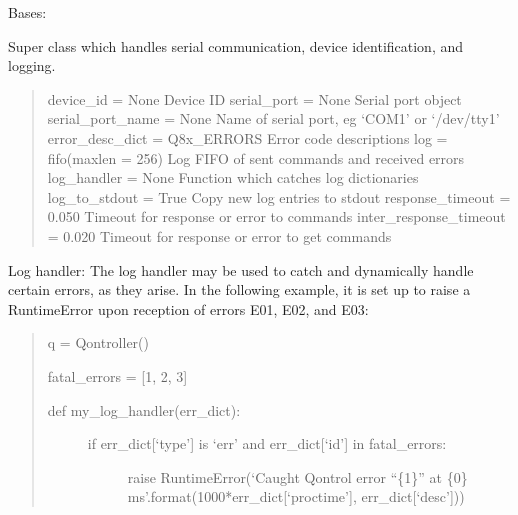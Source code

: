 \documentclass[letterpaper,10pt,english]{sphinxmanual}
\begin{document}

\begin{fulllineitems}
\label{\detokenize{qontrol:qontrol.Qontroller}}
Bases: 

Super class which handles serial communication, device identification, and logging.
\begin{quote}

device\_id = None                                        Device ID
serial\_port = None                                      Serial port object
serial\_port\_name = None                         Name of serial port, eg ‘COM1’ or ‘/dev/tty1’
error\_desc\_dict = Q8x\_ERRORS                    Error code descriptions
log = fifo(maxlen = 256)                        Log FIFO of sent commands and received errors
log\_handler = None                                      Function which catches log dictionaries
log\_to\_stdout = True                            Copy new log entries to stdout
response\_timeout = 0.050                        Timeout for response or error to commands
inter\_response\_timeout = 0.020          Timeout for response or error to get commands
\end{quote}

Log handler:
The log handler may be used to catch and dynamically handle certain errors, as they arise. In the following example, it is set up to raise a RuntimeError upon reception of errors E01, E02, and E03:
\begin{quote}

q = Qontroller()

fatal\_errors = {[}1, 2, 3{]}
\begin{description}
\item[{def my\_log\_handler(err\_dict):}] \leavevmode\begin{description}
\item[{if err\_dict{[}‘type’{]} is ‘err’ and err\_dict{[}‘id’{]} in fatal\_errors:}] \leavevmode
raise RuntimeError(‘Caught Qontrol error “\{1\}” at \{0\} ms’.format(1000*err\_dict{[}‘proctime’{]}, err\_dict{[}‘desc’{]}))

\end{description}

\end{description}


\end{quote}
\end{fulllineitems}
\end{document}
